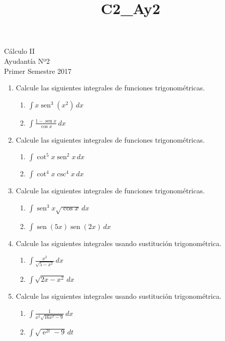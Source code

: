 \documentclass[a4paper,10pt]{article}
\title{C2_Ay2}
\newcommand{\dis}{\displaystyle}
\def\sin{\operatorname{sen}}
\def\e{\operatorname{e}}
\begin{document}
\begin{center}
Cálculo II\\
Ayudantía Nº2\\
Primer Semestre 2017
\end{center}


\begin{enumerate}


\item Calcule las siguientes integrales de funciones
trigonom\'{e}tricas.
\begin{enumerate}[label=\emph{\alph*)}]
\item $\dis \int x\sin^3(x^2)\, dx$
\item $\dis \int \frac{1-\sin x}{\cos x}\, dx$
\end{enumerate}

\item Calcule las siguientes integrales de funciones
trigonom\'{e}tricas.
\begin{enumerate}[label=\emph{\alph*)}]
\item $\dis \int \cot^5 x\sin^2 x\, dx$
\item $\dis \int \cot^4 x\csc^4 x\, dx$
\end{enumerate}

\item Calcule las siguientes integrales de funciones
trigonom\'{e}tricas.
\begin{enumerate}[label=\emph{\alph*)}]
\item $\dis \int \sin^3 x\sqrt{\cos x}\, dx$
\item $\dis \int \sin(5x) \sin(2x)\, dx$
\end{enumerate}

\item Calcule las siguientes integrales usando sustituci\'{o}n
trigonom\'{e}trica.
\begin{enumerate}[label=\emph{\alph*)}]
\item $\dis \int \frac{x^2}{\sqrt{5-x^2}}\, dx$
\item $\dis \int \sqrt{2x-x^2}\, dx$
\end{enumerate}

\item Calcule las siguientes integrales usando sustituci\'{o}n
trigonom\'{e}trica.
\begin{enumerate}[label=\emph{\alph*)}]
\item $\dis \int \frac{1}{x^2\sqrt{16x^2-9}}\, dx$
\item $\dis \int \sqrt{\e^{2t}-9} \, dt$
\end{enumerate}


\end{enumerate}

\vspace{10mm}
\end{document}
